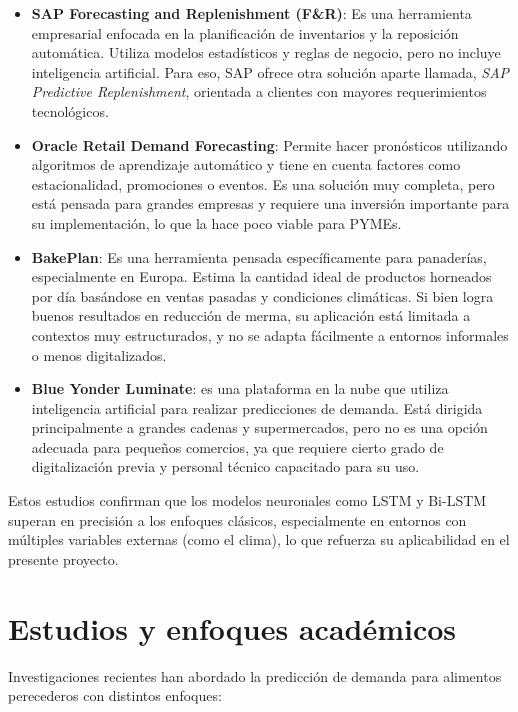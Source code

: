 \begin{itemize}
    \item \textbf{SAP Forecasting and Replenishment (F\&R)}: Es una herramienta empresarial enfocada en la planificación de inventarios y la reposición automática. Utiliza modelos estadísticos y reglas de negocio, pero no incluye inteligencia artificial. Para eso, SAP ofrece otra solución aparte llamada, \textit{SAP Predictive Replenishment}, orientada a clientes con mayores requerimientos tecnológicos.
    
    \item \textbf{Oracle Retail Demand Forecasting}: Permite hacer pronósticos utilizando algoritmos de aprendizaje automático y tiene en cuenta factores como estacionalidad, promociones o eventos. Es una solución muy completa, pero está pensada para grandes empresas y requiere una inversión importante para su implementación, lo que la hace poco viable para PYMEs.
    
    \item \textbf{BakePlan}: Es una herramienta pensada específicamente para panaderías, especialmente en Europa. Estima la cantidad ideal de productos horneados por día basándose en ventas pasadas y condiciones climáticas. Si bien logra buenos resultados en reducción de merma, su aplicación está limitada a contextos muy estructurados, y no se adapta fácilmente a entornos informales o menos digitalizados.
    
    \item \textbf{Blue Yonder Luminate}: es una plataforma en la nube que utiliza inteligencia artificial para realizar predicciones de demanda. Está dirigida principalmente a grandes cadenas y supermercados, pero no es una opción adecuada para pequeños comercios, ya que requiere cierto grado de digitalización previa y personal técnico capacitado para su uso.
\end{itemize}

Estos estudios confirman que los modelos neuronales como LSTM y Bi-LSTM superan en precisión a los enfoques clásicos, especialmente en entornos con múltiples variables externas (como el clima), lo que refuerza su aplicabilidad en el presente proyecto.

\section{Estudios y enfoques académicos}

Investigaciones recientes han abordado la predicción de demanda para alimentos perecederos con distintos enfoques:

